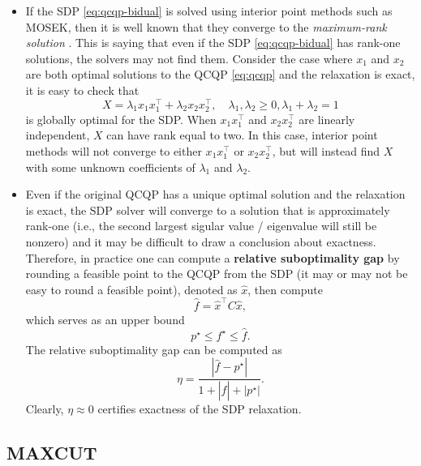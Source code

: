 \documentclass[
]{book}
\theoremstyle{definition}
\theoremstyle{definition}
\theoremstyle{definition}
\theoremstyle{definition}
\theoremstyle{remark}
\begin{document}
\begin{itemize}
\item
  If the SDP \eqref{eq:qcqp-bidual} is solved using interior point methods such as MOSEK, then it is well known that they converge to the \emph{maximum-rank solution} \citep{wolkowicz12book-sdp}. This is saying that even if the SDP \eqref{eq:qcqp-bidual} has rank-one solutions, the solvers may not find them. Consider the case where \(x_1\) and \(x_2\) are both optimal solutions to the QCQP \eqref{eq:qcqp} and the relaxation is exact, it is easy to check that
  \[
  X = \lambda_1 x_1 x_1^\top+ \lambda_2 x_2 x_2^\top, \quad \lambda_1, \lambda_2 \geq 0, \lambda_1 + \lambda_2 = 1
  \]
  is globally optimal for the SDP. When \(x_1 x_1^\top\) and \(x_2 x_2^\top\) are linearly independent, \(X\) can have rank equal to two. In this case, interior point methods will not converge to either \(x_1x_1^\top\) or \(x_2 x_2^\top\), but will instead find \(X\) with some unknown coefficients of \(\lambda_1\) and \(\lambda_2\).
\item
  Even if the original QCQP has a unique optimal solution and the relaxation is exact, the SDP solver will converge to a solution that is approximately rank-one (i.e., the second largest sigular value / eigenvalue will still be nonzero) and it may be difficult to draw a conclusion about exactness. Therefore, in practice one can compute a \textbf{relative suboptimality gap} by rounding a feasible point to the QCQP from the SDP (it may or may not be easy to round a feasible point), denoted as \(\hat{x}\), then compute
  \[
  \hat{f} = \hat{x}^\top C \hat{x},
  \]
  which serves as an upper bound
  \[
  p^\star \leq f^\star \leq \hat{f}.
  \]
  The relative suboptimality gap can be computed as
  \[
  \eta = \frac{|\hat{f} - p^\star|}{1 + |\hat{f}| + |p^\star|}.
  \]
  Clearly, \(\eta \approx 0\) certifies exactness of the SDP relaxation.
\end{itemize}

\hypertarget{maxcut}{%
\subsection{MAXCUT}\label{maxcut}}
\end{document}
